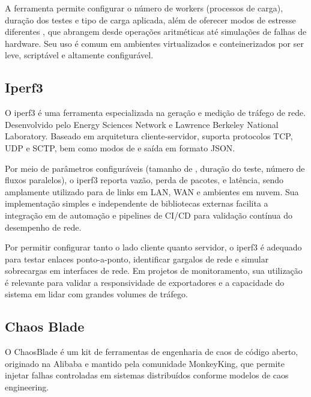 A ferramenta permite configurar o número de workers (processos de carga), duração dos testes e tipo de carga aplicada, além de oferecer modos de estresse diferentes , que abrangem desde operações aritméticas até simulações de falhas de hardware. Seu uso é comum em ambientes virtualizados e conteinerizados por ser leve, scriptável e altamente configurável.

\subsection{Iperf3}
\label{subsection:Iperf3}

O iperf3 \citep{iperf32025} é uma ferramenta especializada na geração e medição de tráfego de rede. Desenvolvido pelo Energy Sciences Network e Lawrence Berkeley National Laboratory. Baseado em arquitetura cliente-servidor, suporta protocolos TCP, UDP e SCTP, bem como modos de  e saída em formato JSON.

Por meio de parâmetros configuráveis (tamanho de , duração do teste, número de fluxos paralelos), o iperf3 reporta vazão, perda de pacotes,  e latência, sendo amplamente utilizado para  de links em LAN, WAN e ambientes em nuvem. Sua implementação simples e independente de bibliotecas externas facilita a integração em  de automação e pipelines de CI/CD para validação contínua do desempenho de rede.

Por permitir configurar tanto o lado cliente quanto servidor, o iperf3 é adequado para testar enlaces ponto-a-ponto, identificar gargalos de rede e simular sobrecargas em interfaces de rede. Em projetos de monitoramento, sua utilização é relevante para validar a responsividade de exportadores e a capacidade do sistema em lidar com grandes volumes de tráfego.
    
\subsection{Chaos Blade}
\label{subsection:ChaosBlade}

O ChaosBlade \citep{chaosblade2025} é um kit de ferramentas de engenharia de caos de código aberto, originado na Alibaba e mantido pela comunidade MonkeyKing, que permite injetar falhas controladas em sistemas distribuídos conforme modelos de caos engineering.

